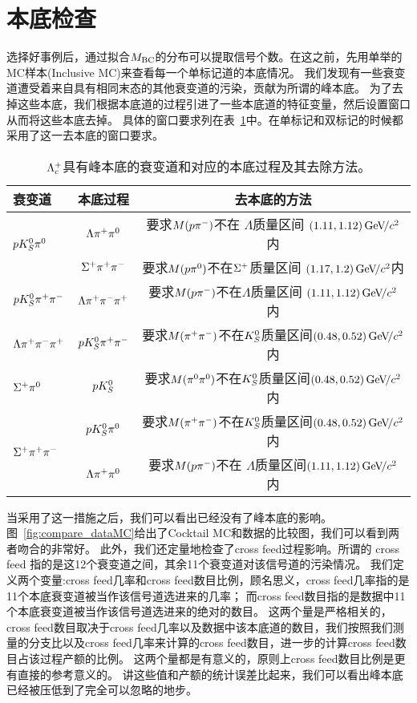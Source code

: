 \section{本底检查}
选择好事例后，通过拟合$M_{\rm BC}$的分布可以提取信号个数。在这之前，先用单举的MC样本(Inclusive MC)来查看每一个单标记道的本底情况。
我们发现有一些衰变道遭受着来自具有相同末态的其他衰变道的污染，贡献为所谓的峰本底。
为了去掉这些本底，我们根据本底道的过程引进了一些本底道的特征变量，然后设置窗口从而将这些本底去掉。
具体的窗口要求列在表~\ref{tab:bkg}中。在单标记和双标记的时候都采用了这一去本底的窗口要求。
\begin{table}
  \begin{center}
  \footnotesize
   \caption{$\Lambda_{c}^{+}$具有峰本底的衰变道和对应的本底过程及其去除方法。}
  \begin{tabular}{l|c|c}
      \hline \hline
       衰变道  & 本底过程& 去本底的方法 \\ \hline
       \multirow{2}{*}{$pK_{S}^0\pi^0$} & $\Lambda\pi^+\pi^0$ & 要求$M(p{{\pi}^-})$不在 $\Lambda$质量区间 $(1.11,1.12){\mathrm{\,Ge\kern -0.1em V\!/}c^2}$内\\ \cline{2-3}
       & $\Sigma^+{{\pi}^+}{{\pi}^-}$ & 要求$M(p\pi^0)$不在$\Sigma^+$质量区间 $(1.17,1.2){\mathrm{\,Ge\kern -0.1em V\!/}c^2}$内 \\ \hline
       $pK_{S}^0\pi^+\pi^-$ & $\Lambda\pi^+\pi^-\pi^+$ & 要求$M(p{{\pi}^-})$不在$\Lambda$质量区间 $(1.11,1.12){\mathrm{\,Ge\kern -0.1em V\!/}c^2}$内 \\ \hline
       $\Lambda\pi^+\pi^-\pi^+$ & $pK_{S}^0\pi^+\pi^-$ & 要求$M({{\pi}^+}{{\pi}^-})$不在$K_{S}^0$质量区间$(0.48,0.52){\mathrm{\,Ge\kern -0.1em V\!/}c^2}$内 \\ \hline
       $\Sigma^{+}\pi^0$ & $pK_{S}^0$ & 要求$M(\pi^0\pi^0)$不在$K_{S}^0$质量区间$(0.48,0.52){\mathrm{\,Ge\kern -0.1em V\!/}c^2}$内 \\ \hline
       \multirow{2}{*}{$\Sigma^{+}\pi^+\pi^-$} & $pK_{S}^0\pi^0$ &要求$M({{\pi}^+}{{\pi}^-})$不在$K_{S}^0$质量区间$(0.48,0.52){\mathrm{\,Ge\kern -0.1em V\!/}c^2}$内 \\ \cline{2-3}
       & $\Lambda\pi^+\pi^0$ &  要求$M(p{{\pi}^-})$不在 $\Lambda$质量区间$(1.11,1.12){\mathrm{\,Ge\kern -0.1em V\!/}c^2}$内 \\ \cline{2-3}
    \hline\hline
   \end{tabular}
   \label{tab:bkg}
  \end{center}
  \end{table}
当采用了这一措施之后，我们可以看出已经没有了峰本底的影响。
图~\ref{fig:compare_dataMC}给出了Cocktail MC和数据的比较图，我们可以看到两者吻合的非常好。
此外，我们还定量地检查了cross feed过程影响。所谓的 cross feed 指的是这12个衰变道之间，其余11个衰变道对该信号道的污染情况。
我们定义两个变量:cross feed几率和cross feed数目比例，顾名思义，cross feed几率指的是11个本底衰变道被当作该信号道选进来的几率；
而cross feed数目指的是数据中11个本底衰变道被当作该信号道选进来的绝对的数目。
这两个量是严格相关的，cross feed数目取决于cross feed几率以及数据中该本底道的数目，我们按照我们测量的分支比以及cross feed几率来计算的cross feed数目，进一步的计算cross feed数目占该过程产额的比例。
这两个量都是有意义的，原则上cross feed数目比例是更有直接的参考意义的。
讲这些值和产额的统计误差比起来，我们可以看出峰本底已经被压低到了完全可以忽略的地步。

